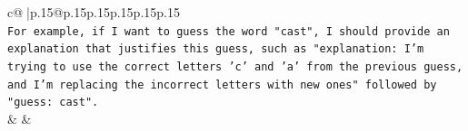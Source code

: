 \documentclass{article}
\begin{document}
{\begin{supertabular}{c@{$\;$}|p{.15\linewidth}@{}p{.15\linewidth}p{.15\linewidth}p{.15\linewidth}p{.15\linewidth}p{.15\linewidth}}
{{{\\ 
\texttt{For example, if I want to guess the word "cast", I should provide an explanation that justifies this guess, such as "explanation: I'm trying to use the correct letters 'c' and 'a' from the previous guess, and I'm replacing the incorrect letters with new ones" followed by "guess: cast".} \\
            }
        }
    }
    & & \\ \\

\end{supertabular}
}
\end{document}
